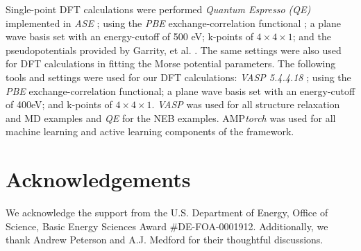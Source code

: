 \documentclass[
 reprint,
 amsmath,
 amssymb,
 aps,
]{revtex4-1}
\begin{document}
Single-point \gls{DFT} calculations were performed \textit{Quantum Espresso (QE) \cite{Giannozzi2009}} implemented in \textit{ASE} \cite{HjorthLarsen2017}; using the \textit{PBE} exchange-correlation functional \cite{Perdew1996}; a plane wave basis set with an energy-cutoff of 500 eV; k-points of $4 \times 4 \times 1$; and the pseudopotentials provided by Garrity, et al. \cite{Garrity2014}. The same settings were also used for \gls{DFT} calculations in fitting the Morse potential parameters. The following tools and settings were used for our DFT calculations: \textit{\gls{VASP} 5.4.4.18} \cite{Kresse1993, Kresse1996}; using the \textit{PBE} exchange-correlation functional; a plane wave basis set with an energy-cutoff of 400eV; and k-points of $4\times4\times1$. \textit{\gls{VASP}} was used for all structure relaxation and MD examples and \textit{QE} for the NEB examples. AMP\textit{torch} \cite{amptorch} was used for all machine learning and active learning components of the framework.

\section{Acknowledgements}

We acknowledge the support from the U.S. Department of Energy, Office of Science, Basic Energy Sciences Award \#{}DE-FOA-0001912. Additionally, we thank Andrew Peterson and A.J. Medford for their thoughtful discussions.
\clearpage

\clearpage
\end{document}
